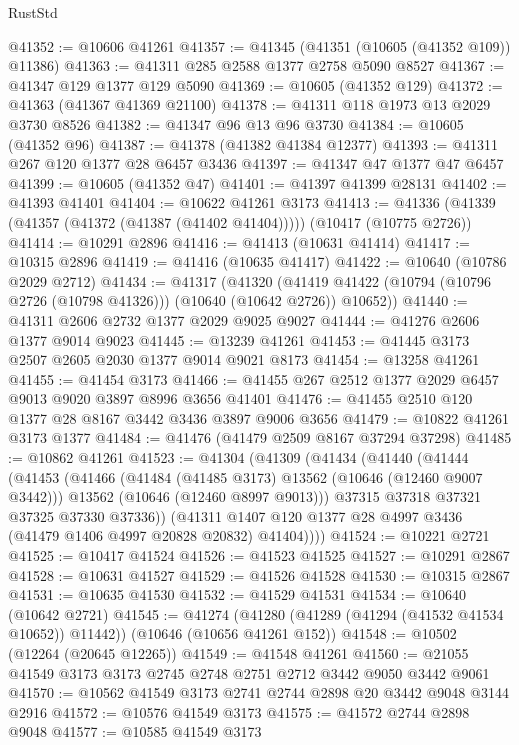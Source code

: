 \begin{lexlean}{RustStd}
\begin{coremodule}
@41352 := @10606 @41261
@41357 := @41345 (@41351 (@10605 (@41352 @109)) @11386)
@41363 := @41311 @285 @2588 @1377 @2758 @5090 @8527
@41367 := @41347 @129 @1377 @129 @5090
@41369 := @10605 (@41352 @129)
@41372 := @41363 (@41367 @41369 @21100)
@41378 := @41311 @118 @1973 @13 @2029 @3730 @8526
@41382 := @41347 @96 @13 @96 @3730
@41384 := @10605 (@41352 @96)
@41387 := @41378 (@41382 @41384 @12377)
@41393 := @41311 @267 @120 @1377 @28 @6457 @3436
@41397 := @41347 @47 @1377 @47 @6457
@41399 := @10605 (@41352 @47)
@41401 := @41397 @41399 @28131
@41402 := @41393 @41401
@41404 := @10622 @41261 @3173
@41413 := @41336 (@41339 (@41357 (@41372 (@41387 (@41402 @41404))))) (@10417 (@10775 @2726))
@41414 := @10291 @2896
@41416 := @41413 (@10631 @41414)
@41417 := @10315 @2896
@41419 := @41416 (@10635 @41417)
@41422 := @10640 (@10786 @2029 @2712)
@41434 := @41317
    (@41320 (@41419 @41422 (@10794 (@10796 @2726 (@10798 @41326))) (@10640 (@10642 @2726)) @10652))
@41440 := @41311 @2606 @2732 @1377 @2029 @9025 @9027
@41444 := @41276 @2606 @1377 @9014 @9023
@41445 := @13239 @41261
@41453 := @41445 @3173 @2507 @2605 @2030 @1377 @9014 @9021 @8173
@41454 := @13258 @41261
@41455 := @41454 @3173
@41466 := @41455 @267 @2512 @1377 @2029 @6457 @9013 @9020 @3897 @8996 @3656 @41401
@41476 := @41455 @2510 @120 @1377 @28 @8167 @3442 @3436 @3897 @9006 @3656
@41479 := @10822 @41261 @3173 @1377
@41484 := @41476 (@41479 @2509 @8167 @37294 @37298)
@41485 := @10862 @41261
@41523 := @41304
    (@41309
      (@41434
        (@41440
          (@41444
            (@41453
              (@41466
                (@41484 (@41485 @3173) @13562 (@10646 (@12460 @9007 @3442)))
                @13562
                (@10646 (@12460 @8997 @9013)))
              @37315
              @37318
              @37321
              @37325
              @37330
              @37336))
          (@41311 @1407 @120 @1377 @28 @4997 @3436 (@41479 @1406 @4997 @20828 @20832) @41404))))
@41524 := @10221 @2721
@41525 := @10417 @41524
@41526 := @41523 @41525
@41527 := @10291 @2867
@41528 := @10631 @41527
@41529 := @41526 @41528
@41530 := @10315 @2867
@41531 := @10635 @41530
@41532 := @41529 @41531
@41534 := @10640 (@10642 @2721)
@41545 := @41274
    (@41280 (@41289 (@41294 (@41532 @41534 @10652)) @11442))
    (@10646 (@10656 @41261 @152))
@41548 := @10502 (@12264 (@20645 @12265))
@41549 := @41548 @41261
@41560 := @21055 @41549 @3173 @3173 @2745 @2748 @2751 @2712 @3442 @9050 @3442 @9061
@41570 := @10562 @41549 @3173 @2741 @2744 @2898 @20 @3442 @9048 @3144 @2916
@41572 := @10576 @41549 @3173
@41575 := @41572 @2744 @2898 @9048
@41577 := @10585 @41549 @3173

\end{coremodule}
\end{lexlean}
